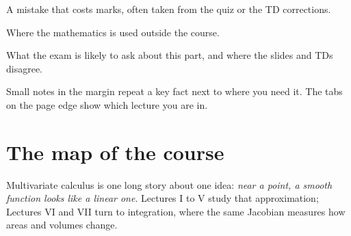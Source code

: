 \begin{trap}
A mistake that costs marks, often taken from the quiz or the TD corrections.
\end{trap}

\begin{reallife}
Where the mathematics is used outside the course.
\end{reallife}

\begin{examnote}
What the exam is likely to ask about this part, and where the slides and TDs disagree.
\end{examnote}

Small notes in the margin repeat a key fact next to where you need it. The tabs on the page edge
show which lecture you are in.

\section*{The map of the course}

Multivariate calculus is one long story about one idea: \emph{near a point, a smooth function
looks like a linear one}. Lectures I to V study that approximation; Lectures VI and VII turn
to integration, where the same Jacobian measures how areas and volumes change.

